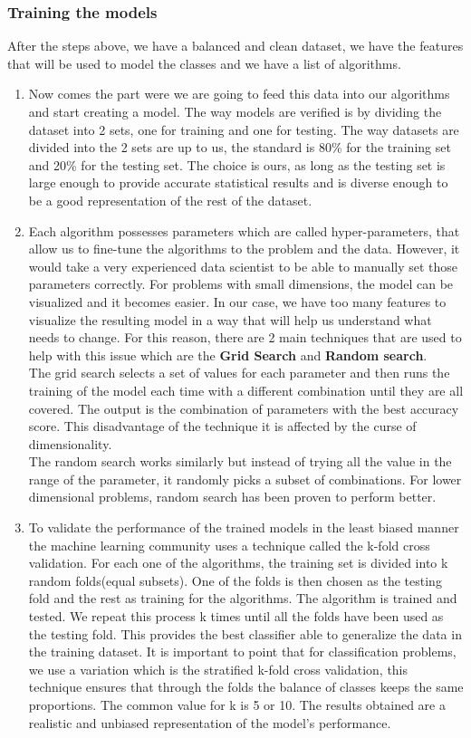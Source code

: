 \subsubsection{Training the models}
After the steps above, we have a balanced and clean dataset, we have the features that will be used to model the classes and we have a list of algorithms.
\begin{enumerate}
\item Now comes the part were we are going to feed this data into our algorithms and start creating a model. The way models are verified is by dividing the dataset into 2 sets, one for training and one for testing. The way datasets are divided into the 2 sets are up to us, the standard is 80\% for the training set and 20\% for the testing set. The choice is ours, as long as the testing set is large enough to provide accurate statistical results and is diverse enough to be a good representation of the rest of the dataset.\\
\item Each algorithm possesses parameters which are called hyper-parameters, that allow us to fine-tune the algorithms to the problem and the data. However, it would take a very experienced data scientist to be able to manually set those parameters correctly. For problems with small dimensions, the model can be visualized and it becomes easier. In our case, we have too many features to visualize the resulting model in a way that will help us understand what needs to change. For this reason, there are 2 main techniques that are used to help with this issue which are the \textbf{Grid Search} and \textbf{Random search}\cite{ml-search}. \\ 
The grid search selects a set of values for each parameter and then runs the training of the model each time with a different combination until they are all covered. The output is the combination of parameters with the best accuracy score. This disadvantage of the technique it is affected by the curse of dimensionality. \\
The random search works similarly but instead of trying all the value in the range of the parameter, it randomly picks a subset of combinations. For lower dimensional problems, random search has been proven to perform better.
\item To validate the performance of the trained models in the least biased manner the machine learning community uses a technique called the k-fold cross validation\cite{10-fold}. For each one of the algorithms, the training set is divided into k random folds(equal subsets). One of the folds is then chosen as the testing fold and the rest as training for the algorithms. The algorithm is trained and tested. We repeat this process k times until all the folds have been used as the testing fold. This provides the best classifier able to generalize the data in the training dataset. It is important to point that for classification problems, we use a variation which is the stratified k-fold cross validation, this technique ensures that through the folds the balance of classes keeps the same proportions. The common value for k is 5 or 10. The results obtained are a realistic and unbiased representation of the model's performance.
\end{enumerate} 
